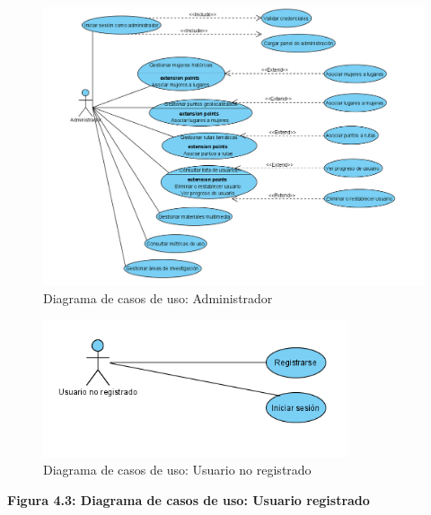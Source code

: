 \begin{figure}[H]
    \centering
    \includegraphics[width=1\textwidth]{figs/diagrama_administrador.png}
    \caption{Diagrama de casos de uso: Administrador}
\end{figure}

\begin{figure}[H]
    \centering
    \includegraphics[width=0.8\textwidth]{figs/diagrama_usuario_no_registrado.png}
    \caption{Diagrama de casos de uso: Usuario no registrado}
\end{figure}


\begin{landscape}
    \vfill
    \centering
    \par\vspace{1ex}
    \textbf{Figura 4.3: Diagrama de casos de uso: Usuario registrado}
    \vfill
\end{landscape}


